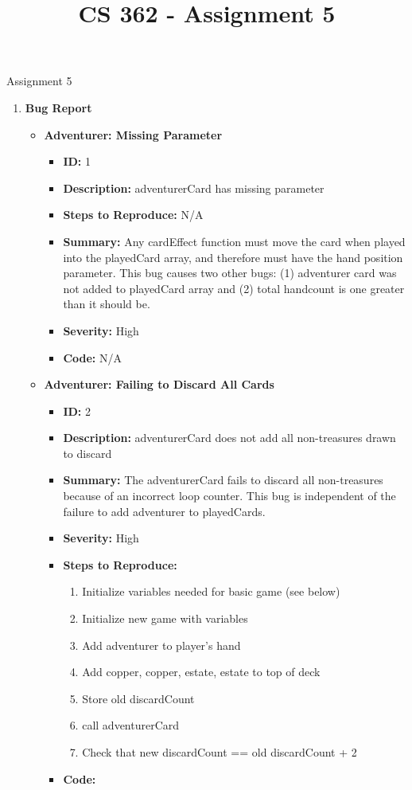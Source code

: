 \documentclass[11pt,letterpaper]{article}
\begin{document}
 \univlogo

\title{CS 362 - Assignment 5}
{\Huge Assignment 5}\\[5mm]
\begin{enumerate}[label=\Roman*.]
  \item \textbf{Bug Report}
    \begin{itemize}[label=]
      \item \textbf{Adventurer: Missing Parameter}

        \begin{itemize}[label=]
          \item \textbf{ID:} 1
          \item \textbf{Description:} adventurerCard has missing parameter
          \item \textbf{Steps to Reproduce:} N/A
          \item \textbf{Summary:}
            Any cardEffect function must move the card when played into
            the playedCard array, and therefore must have the hand position
            parameter. This bug causes two other bugs:
            (1) adventurer card was not added to playedCard array
            and (2) total handcount is one greater than it should be.
          \item \textbf{Severity:} High
          \item \textbf{Code:} N/A
        \end{itemize}

      \item \textbf{Adventurer: Failing to Discard All Cards}
        \begin{itemize}[label=]
          \item \textbf{ID:} 2
          \item \textbf{Description:} adventurerCard does not add all 
            non-treasures drawn to discard
          \item \textbf{Summary:} The adventurerCard fails to discard
            all non-treasures because of an incorrect loop counter. This
            bug is independent of the failure to add adventurer to playedCards.
          \item \textbf{Severity:} High
          \item \textbf{Steps to Reproduce:} 
            \begin{enumerate}
              \item Initialize variables needed for basic game (see below)
              \item Initialize new game with variables
              \item Add adventurer to player's hand
              \item Add copper, copper, estate, estate to top of deck
              \item Store old discardCount
              \item call adventurerCard
              \item Check that new discardCount == old discardCount + 2
            \end{enumerate}
          \item \textbf{Code:} 


\end{itemize}
\end{itemize}
\end{enumerate}
\end{document}
